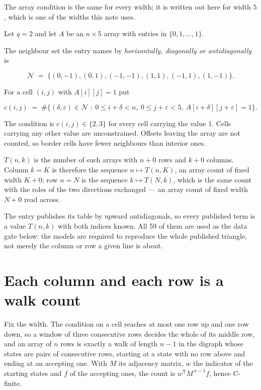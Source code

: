 \documentclass[11pt]{article}
\theoremstyle{definition}
\begin{document}
The array condition is the same for every width; it is written out here for width $5$, which is one of the widths this note uses.

Let $q = 2$ and let $A$ be an $n \times 5$ array with entries in $\{0,1,\dots,1\}$.

The neighbour set the entry names by {\itshape horizontally, diagonally or antidiagonally} is

\[\mathcal{N} \;=\; \{(0,-1), (0,1), (-1,-1), (1,1), (-1,1), (1,-1)\}.\]

For a cell $(i,j)$ with $A[i][j] = 1$ put

\[c(i,j) \;=\; \#\bigl\{(\delta,\varepsilon)\in\mathcal{N} \;:\; 0\le i+\delta<n,\ 0\le j+\varepsilon<5,\ A[i+\delta][j+\varepsilon] = 1\bigr\}.\]

The condition is $c(i,j) \in \{2, 3\}$ for every cell carrying the value 1. Cells carrying any other value are unconstrained. Offsets leaving the array are not counted, so border cells have fewer neighbours than interior ones.

$T(n,k)$ is the number of such arrays with $n + 0$ rows and $k + 0$ columns. Column $k = K$ is therefore the sequence $n \mapsto T(n,K)$, an array count of fixed width $K + 0$; row $n = N$ is the sequence $k \mapsto T(N,k)$, which is the same count with the roles of the two directions exchanged --- an array count of fixed width $N + 0$ read across.

The entry publishes its table by upward antidiagonals, so every published term is a value $T(n,k)$ with both indices known. All 59 of them are used as the data gate below: the models are required to reproduce the whole published triangle, not merely the column or row a given line is about.

\section{Each column and each row is a walk count}

Fix the width. The condition on a cell reaches at most one row up and one row down, so a window of three consecutive rows decides the whole of its middle row, and an array of $n$ rows is exactly a walk of length $n-1$ in the digraph whose states are pairs of consecutive rows, starting at a state with no row above and ending at an accepting one. With $M$ its adjacency matrix, $w$ the indicator of the starting states and $f$ of the accepting ones, the count is $w^{\mathsf T}M^{\,n-1}f$, hence C-finite.
\end{document}
